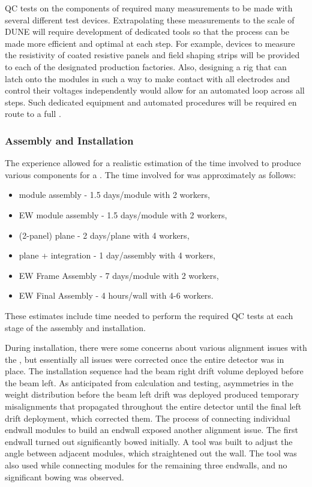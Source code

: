 QC tests on the  components of  required many measurements to be made with several different test devices.  Extrapolating these measurements to the scale of DUNE will require development of dedicated tools so that the  process can be made more efficient and optimal at each step.
For example, devices to measure the resistivity of  coated resistive panels and field shaping strips will be provided to each of the designated production factories.  Also, designing a rig that can latch onto the  modules in such a way to make contact with all electrodes and control their voltages independently would allow for an automated loop across all steps.
Such dedicated equipment and automated procedures will be required en route to a full .

\subsubsection{Assembly and Installation}
\label{sec:fdsp-hv-protodune-lessons-assy}

The  experience allowed for a realistic estimation of the time involved to produce various  components for a .
The time involved for  was approximately as follows:
\begin{itemize}
\item {} module assembly - 1.5 days/module with 2 workers,
\item EW module assembly - 1.5 days/module with 2 workers,
\item {} (2-panel) plane - 2 days/plane with 4 workers,
\item {} plane +  integration - 1 day/assembly with 4 workers,
\item EW Frame Assembly - 7 days/module with 2 workers,
\item EW Final Assembly - 4 hours/wall with 4-6 workers.
\end{itemize}
These estimates include time needed to perform the required QC tests at each stage of the assembly and installation.

During installation, there were some concerns about various alignment issues with the , but essentially all issues were corrected once the entire detector was in place.
The  installation sequence had the beam right drift volume deployed before the beam left.
As anticipated from calculation and testing, asymmetries in the weight distribution before the beam left drift was deployed produced temporary misalignments that propagated throughout the entire detector until the final left drift deployment, which corrected them.
The process of connecting individual endwall modules to build an endwall exposed another alignment issue.
The first endwall turned out significantly bowed initially.
A tool was built to adjust the angle between adjacent modules, which straightened out the wall.
The tool was also used while connecting modules for the remaining three endwalls, and no significant bowing was observed.



